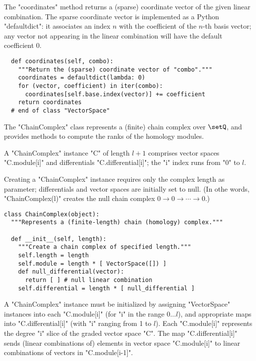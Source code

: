 The "coordinates" method returns a (sparse) coordinate vector of the
given linear combination.  The sparse coordinate vector is implemented
as a Python "defaultdict":  it associates an index $n$ with the
coefficient of the $n$-th basis vector; any vector not appearing in
the linear combination will have the default coefficient $0$.
\begin{lstlisting}
  def coordinates(self, combo):
    """Return the (sparse) coordinate vector of "combo"."""
    coordinates = defaultdict(lambda: 0) 
    for (vector, coefficient) in iter(combo):
      coordinates[self.base.index(vector)] += coefficient
    return coordinates
  # end of class "VectorSpace"

\end{lstlisting}

The "ChainComplex" class represents a (finite) chain complex over
$\setQ$, and provides methods to compute the ranks of the homology
modules.

A "ChainComplex" instance "C" of length $l+1$ comprises vector spaces
"C.module[i]" and differentials "C.differential[i]"; the "i" index
runs from "0" to $l$.  

Creating a "ChainComplex" instance requires only the complex length as
parameter; differentials and vector spaces are initially set to null.
(In othe words, "ChainComplex(l)" creates the null chain complex $0
\to 0 \to \cdots \to 0$.)
\begin{lstlisting}
class ChainComplex(object):
  """Represents a (finite-length) chain (homology) complex."""

  def __init__(self, length):
    """Create a chain complex of specified length."""
    self.length = length
    self.module = length * [ VectorSpace([]) ]
    def null_differential(vector):
      return [ ] # null linear combination
    self.differential = length * [ null_differential ]

\end{lstlisting}
A "ChainComplex" instance must be initialized by assigning
"VectorSpace" instances into each "C.module[i]" (for "i" in the range
$0 \ldots l$), and appropriate maps into "C.differential[i]" (with "i"
ranging from 1 to $l$).  Each "C.module[i]" represents the degree "i"
slice of the graded vector space "C".  The map "C.differential[i]"
sends (linear combinations of) elements in vector space "C.module[i]"
to linear combinations of vectors in "C.module[i-1]".

